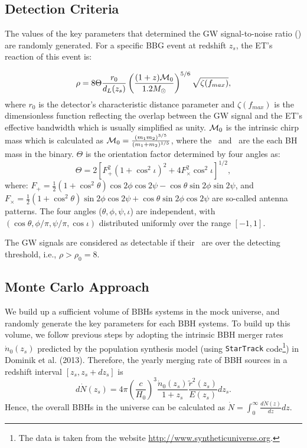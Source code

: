 \documentclass[twocolumn]{aastex62}
\begin{document}
\subsection{Detection Criteria} \label{subsec_criteria}
The values of the key parameters that determined the GW signal-to-noise ratio (\snr) are randomly generated. For a specific BBG event at redshift $z_s$, the ET's reaction of this event is:

\begin{equation} \label{SNR}
\rho = 8 \Theta \frac{r_0}{d_L(z_s)} \left( \frac{(1+z){\cal M}_0}{1.2 M_{\odot}} \right)^{5/6}
\sqrt {\zeta(f_{max})},
\end{equation}
where $r_0$ is the detector's characteristic distance parameter and $\zeta(f_{max})$ is the dimensionless function reflecting the overlap between the GW signal and the ET's effective bandwidth which is usually simplified as unity. ${\cal M}_0$ is the intrinsic chirp mass which is calculated as $ {\cal M}_0 = \frac{(m_1m_2)^{3/5}}{(m_1+m_2)^{1/5}}$, where the \mone\ and \mtwo\ are the each BH mass in the binary. $\Theta$ is the orientation factor determined by four angles as:
 \begin{equation} \label{Theta}
 \Theta = 2 [ F_{+}^2(1 + \cos^2{\iota} )^2 + 4 F_{\times}^2 \cos^2{\iota} ]^{1/2},
 \end{equation}
where: $F_{+} = \frac{1}{2} (1 + \cos^2{\theta}) \cos{2\phi} \cos{2 \psi} - \cos{\theta} \sin{2 \phi} \sin{ 2 \psi}$, and
$F_{\times} = \frac{1}{2} (1 + \cos^2{\theta}) \sin{2\phi} \cos{2 \psi} + \cos{\theta} \sin{2 \phi} \cos{ 2 \psi}$ are so-called antenna patterns. The four angles ($\theta, \phi, \psi, \iota$) are independent, with $(\cos\theta, \phi/\pi, \psi/\pi, \cos\iota)$ distributed uniformly over the range $[-1, 1]$. 

The GW signals are considered as detectable if their \snr\ are over the detecting threshold, i.e., $\rho > \rho_0 = 8$.

\subsection{Monte Carlo Approach} \label{MC}
We build up a sufficient volume of BBHs systems in the mock universe, and randomly generate the key parameters for each BBH systems. To build up this volume, we follow previous steps by adopting the intrinsic BBH merger rates $\dot{n}_{0}(z_{s})$ predicted by the population synthesis model (using {\tt StarTrack} code\footnote{The data is taken from the website \url{http://www.syntheticuniverse.org}.}) in Dominik et al. (2013). Therefore, the yearly  merging rate of BBH sources in a redshift interval  $[z_{s}, z_{s}+dz_{s}]$ is 
 \begin{equation}
 d\dot{N} (z_s)=4\pi\left(\frac{c}{H_{0}}\right)^3\frac{\dot{n}_{0}(z_{s})}{1+z_{s}}\frac{\tilde{r}^2(z_{s})}{E(z_{s})}dz_{s}. 
 \end{equation}
Hence, the overall BBHs in the universe can be calculated as ${\dot N} = \int_0^{ \infty} \frac{d {\dot N (z)}}{dz} dz$.
\end{document}
